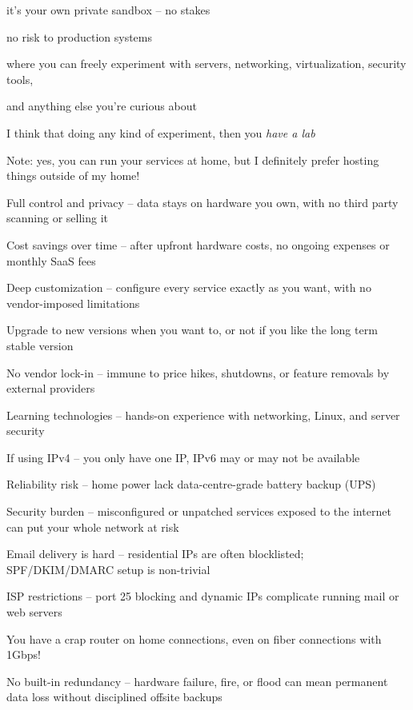 \documentclass[Screen16to9,17pt]{foils}
\begin{document}
\begin{list2}
\item it's your own private sandbox -- no stakes
\item no risk to production systems
\item where you can freely experiment with servers, networking, virtualization, security tools,
\item and anything else you're curious about
\item I think that doing any kind of experiment, then you \emph{have a lab}
\end{list2}

Note: yes, you can run your services at home, but I definitely prefer hosting things outside of my home!


\begin{list2}
\item Full control and privacy -- data stays on hardware you own, with no third party scanning or selling it
\item Cost savings over time -- after upfront hardware costs, no ongoing expenses or monthly SaaS fees
\item Deep customization -- configure every service exactly as you want, with no vendor-imposed limitations
\item Upgrade to new versions when you want to, or not if you like the long term stable version
\item No vendor lock-in -- immune to price hikes, shutdowns, or feature removals by external providers
\item Learning technologies -- hands-on experience with networking, Linux, and server security
\end{list2}



\begin{list2}
\item If using IPv4 -- you only have one IP, IPv6 may or may not be available
\item Reliability risk -- home power lack data-centre-grade battery backup (UPS)
\item Security burden -- misconfigured or unpatched services exposed to the internet can put your whole network at risk
\item Email delivery is hard -- residential IPs are often blocklisted; SPF/DKIM/DMARC setup is non-trivial
\item ISP restrictions -- port 25 blocking and dynamic IPs complicate running mail or web servers
\item You have a crap router on home connections, even on fiber connections with 1Gbps!
\item No built-in redundancy -- hardware failure, fire, or flood can mean permanent data loss without disciplined offsite backups
\end{list2}
\end{document}
